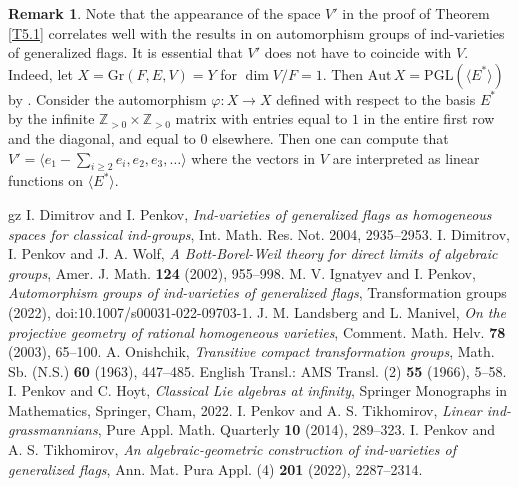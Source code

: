 \documentclass[12pt]{amsart}
\newcommand{\Grass}{\mathrm{Gr}}
\theoremstyle{definition}
\newtheorem{remark}[theorem]{Remark}
\begin{document}
\begin{remark}
Note that the appearance of the space $V'$ in the proof of Theorem \ref{T5.1} correlates well with the results in \cite{IP} on automorphism groups of ind-varieties of generalized flags. It is essential that $V'$ does not have to coincide with $V$. Indeed, let $X=\Grass(F,E,V)=Y$ for $\dim V/F=1$. Then $\mathrm{Aut}\,X=\mathrm{PGL}(\langle E^*\rangle)$ by \cite{IP}. Consider the automorphism $\varphi:X\to X$ defined with respect to the basis $E^*$ by the infinite $\mathbb{Z}_{>0}\times\mathbb{Z}_{>0}$ matrix with entries equal to $1$ in the entire first row and the diagonal, and equal to $0$ elsewhere. Then one can compute that  $V'=\langle e_1-\sum_{i\geq 2}e_i,e_2,e_3,\ldots \rangle$
where the vectors in $V$ are interpreted as linear functions on $\langle E^*\rangle$. 
\end{remark}




%

%


\begin{thebibliography}{gz}
 I. Dimitrov and I. Penkov, \emph{Ind-varieties of generalized flags as homogeneous
spaces for classical ind-groups}, Int. Math. Res. Not. 2004, 2935--2953.
 I. Dimitrov, I. Penkov and J. A. Wolf, \emph{A Bott-Borel-Weil theory for direct limits of algebraic groups},
Amer. J. Math. {\bf 124} (2002), 955--998.
 M. V. Ignatyev and I. Penkov, \emph{Automorphism groups of ind-varieties of generalized flags}, Transformation groups (2022),
doi:10.1007/s00031-022-09703-1.
J. M. Landsberg and L. Manivel,
\emph{On the projective geometry of rational homogeneous varieties}, Comment. Math. Helv. {\bf 78} (2003), 65--100.
 A. Onishchik, \emph{Transitive compact transformation groups}, Math. Sb. (N.S.) {\bf 60} (1963), 447--485.
English Transl.: AMS Transl. (2) {\bf 55} (1966), 5--58.
 I. Penkov and C. Hoyt, 
\emph{Classical Lie algebras at infinity}, Springer Monographs in Mathematics, Springer, Cham, 2022.
 I. Penkov and A. S. Tikhomirov, \emph{Linear ind-grassmannians}, Pure Appl. Math. Quarterly {\bf 10} (2014), 289--323.
 I. Penkov and A. S. Tikhomirov, \emph{An algebraic-geometric construction of ind-varieties of generalized flags}, Ann. Mat. Pura Appl. (4) {\bf 201} (2022), 2287--2314.
\end{thebibliography}
\end{document}
